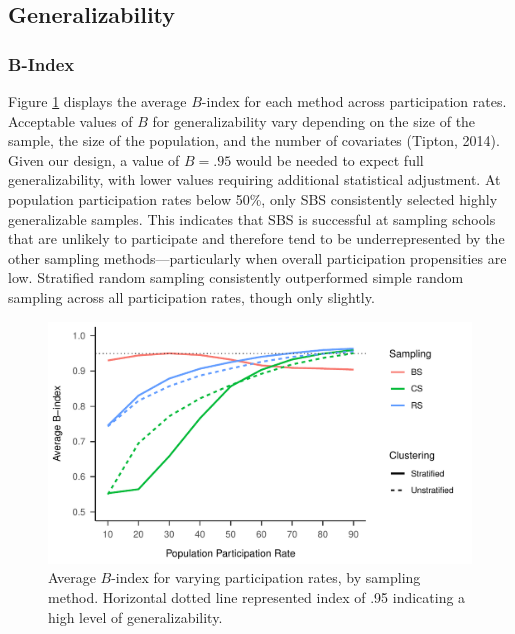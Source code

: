 \documentclass[
  english,
  man,floatsintext]{apa6}
\begin{document}
\hypertarget{generalizability-1}{%
\subsection{Generalizability}\label{generalizability-1}}

\hypertarget{b-index}{%
\subsubsection{B-Index}\label{b-index}}

Figure \ref{fig:fig-avg-Bindex} displays the average \(B\)-index for each method across participation rates. Acceptable values of \(B\) for generalizability vary depending on the size of the sample, the size of the population, and the number of covariates (Tipton, 2014). Given our design, a value of \(B = .95\) would be needed to expect full generalizability, with lower values requiring additional statistical adjustment. At population participation rates below 50\%, only SBS consistently selected highly generalizable samples. This indicates that SBS is successful at sampling schools that are unlikely to participate and therefore tend to be underrepresented by the other sampling methods---particularly when overall participation propensities are low. Stratified random sampling consistently outperformed simple random sampling across all participation rates, though only slightly.

\begin{figure}
\centering
\includegraphics{GenSamp-Paper_files/figure-latex/fig-avg-Bindex-1.pdf}
\caption{\label{fig:fig-avg-Bindex}Average \(B\)-index for varying participation rates, by sampling method. Horizontal dotted line represented index of .95 indicating a high level of generalizability.}
\end{figure}
\end{document}

